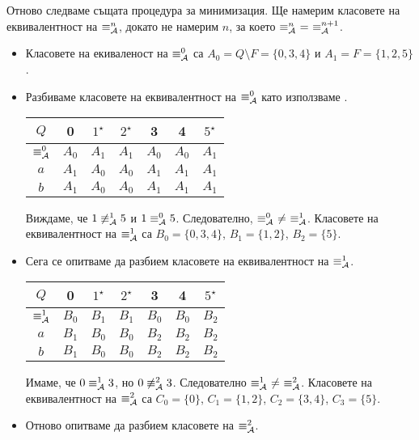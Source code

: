 \begin{example}
  
  Отново следваме същата процедура за минимизация.
  Ще намерим класовете на еквивалентност на $\equiv^n_{\mathcal{A}}$,
  докато не намерим $n$, за което $\equiv^n_\A\ =\ \equiv^{n+1}_\A$.
  \begin{itemize}
  \item
    Класовете на екиваленост на $\equiv^0_{\mathcal{A}}$ са 
    $A_0 = Q\setminus F = \{0,3,4\}$ и $A_1 = F = \{1,2,5\}$.
  \item
    Разбиваме класовете на еквивалентност на $\equiv^0_{\mathcal{A}}$ като използваме .
    
    \begin{tabular}{|c|c|c|c|c|c|c|}
      \hline
      $Q$ & 0 & $1^\star$ & $2^\star$ & 3 & 4 & $5^\star$ \\
      \hline
      \hline
      $\equiv^0_{\mathcal{A}}$ & $A_0$ & $A_1$ & $A_1$ & $A_0$ & $A_0$ & $A_1$\\
      \hline
      $a$ & $A_1$& $A_0$ & $A_0$ & $A_1$ & $A_1$ & $A_1$\\
      \hline
      $b$ & $A_1$& $A_0$ & $A_0$ & $A_1$ & $A_1$ & $A_1$\\
      \hline
    \end{tabular}
    
    Виждаме, че $1 \not\equiv^1_{\mathcal{A}} 5$ и $1 \equiv^0_{\mathcal{A}} 5$.
    Следователно, $\equiv^0_{\mathcal{A}}\ \neq\ \equiv^1_{\mathcal{A}}$.
    Класовете на еквивалентност на $\equiv^1_{\mathcal{A}}$ са 
    $B_0 = \{0,3,4\}$, $B_1 = \{1,2\}$, $B_2 = \{5\}$.
  \item
    Сега се опитваме да разбием класовете на еквивалентност на $\equiv^1_{\mathcal{A}}$.

    \begin{tabular}{|c|c|c|c|c|c|c|}
      \hline
      $Q$ & 0 & $1^\star$ & $2^\star$ & 3 & 4 & $5^\star$ \\
      \hline
      \hline
      $\equiv^1_{\mathcal{A}}$ & $B_0$ & $B_1$ & $B_1$ & $B_0$ & $B_0$ & $B_2$\\
      \hline
      $a$ & $B_1$ & $B_0$ & $B_0$ & $B_2$ & $B_2$ & $B_2$\\
      \hline
      $b$ & $B_1$ & $B_0$ & $B_0$ & $B_2$ & $B_2$ & $B_2$\\
      \hline
    \end{tabular}
    
    Имаме, че $0 \equiv^1_{\mathcal{A}} 3$, но $0 \not\equiv^2_{\mathcal{A}} 3$. Следователно $\equiv^1_{\mathcal{A}}\ \neq\ \equiv^2_{\mathcal{A}}$.
    Класовете на еквивалентност на $\equiv^2_{\mathcal{A}}$ са 
    $C_0 = \{0\}$, $C_1 = \{1,2\}$, $C_2 = \{3,4\}$, $C_3 = \{5\}$.
  \item
    Отново опитваме да разбием класовете на $\equiv^2_{\mathcal{A}}$.


\end{itemize}
\end{example}
